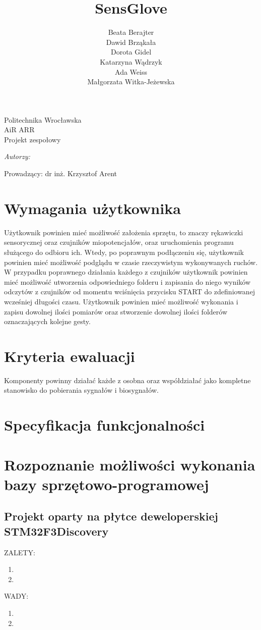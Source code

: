 \documentclass{article}
\author{Beata Berajter\\
Dawid Brząkała\\
Dorota Gidel\\
Katarzyna Wądrzyk\\
Ada Weiss\\
Małgorzata Witka-Jeżewska\\
 }%
\title{SensGlove}
\makeatletter
\renewcommand{\maketitle}{\begin{titlepage}
    \vspace*{1cm}
    \begin{center}
    Politechnika Wrocławska\\
    AiR ARR\\
 Projekt zespołowy
    \end{center}
      \vspace{3cm}
    \begin{center}

     \LARGE \textsc {\@title}
         \end{center}
     \vspace{1cm}

    \begin{center}
    \textit{ Autorzy:}\\
   \textit{\@author}
     \end{center}
      \vspace{1cm}

     \begin{center}

    Prowadzący:
  dr inż. Krzysztof Arent %
    \end{center}

    \vspace*{\stretch{6}}
    \begin{center}
    \@date
    \end{center}
  \end{titlepage}
}
\makeatother
\begin{document}
\maketitle
\newpage
\tableofcontents
\newpage


\section{Wymagania użytkownika}
Użytkownik powinien mieć możliwość założenia sprzętu, to znaczy rękawiczki sensorycznej oraz czujników miopotencjałów, oraz uruchomienia programu służącego do odbioru ich. Wtedy, po poprawnym podłączeniu się, użytkownik powinien mieć możliwość podglądu w czasie rzeczywistym wykonywanych ruchów. W przypadku poprawnego działania każdego z czujników użytkownik powinien mieć możliwość utworzenia odpowiedniego folderu i zapisania do niego wyników odczytów z czujników od momentu wciśnięcia przycisku START do zdefiniowanej wcześniej długości czasu. Użytkownik powinien mieć możliwość wykonania i zapisu dowolnej ilości pomiarów oraz stworzenie dowolnej ilości folderów oznaczających kolejne gesty.

\section{Kryteria ewaluacji}
Komponenty powinny działać każde z osobna oraz współdziałać jako kompletne stanowisko do pobierania sygnałów i biosygnałów.


\section{Specyfikacja funkcjonalności}
\section{Rozpoznanie możliwości wykonania bazy sprzętowo-programowej}

\subsection{Projekt oparty na płytce deweloperskiej STM32F3Discovery}
ZALETY:\\
\begin{enumerate}
    \item
    \item
\end{enumerate}
WADY:\\
\begin{enumerate}
    \item
    \item
\end{enumerate}
\end{document}
